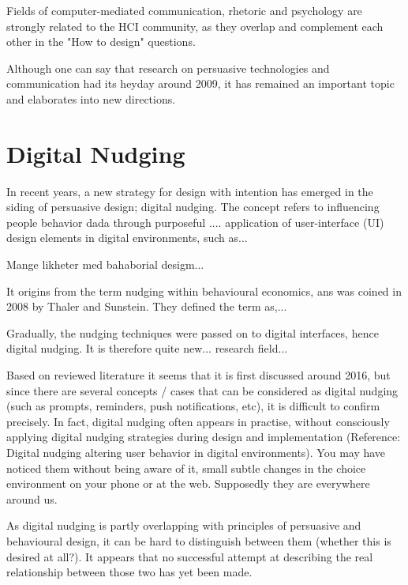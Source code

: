 {Fields of computer-mediated communication, rhetoric and psychology are strongly related to the HCI community, as they overlap and complement each other in the "How to design" questions. 


Although one can say that research on persuasive technologies and communication had its heyday around 2009, it has remained an important topic and elaborates into new directions. 


\section{Digital Nudging}
In recent years, a new strategy for design with intention has emerged in the siding of persuasive design; digital nudging. The concept refers to influencing people behavior dada through purposeful .... application of user-interface (UI) design elements in digital environments, such as... 

Mange likheter med bahaborial desigm... 

It origins from the term nudging within behavioural economics, ans was coined in 2008 by Thaler and Sunstein. They defined the term as,...

Gradually, the nudging techniques were passed on to digital interfaces, hence digital nudging. It is therefore quite new...  research field... 

Based on reviewed literature it seems that it is first discussed around 2016, but since there are several concepts / cases that can be considered as digital nudging (such as prompts, reminders, push notifications, etc), it is difficult to confirm precisely. In fact, digital nudging often appears in practise, without consciously applying digital nudging strategies during design and implementation (Reference: Digital nudging altering user behavior in digital environments). You may have noticed them without being aware of it, small subtle changes in the choice environment on your phone or at the web. Supposedly they are everywhere around us.

As digital nudging is partly overlapping with principles of persuasive and behavioural design, it can be hard to distinguish between them (whether this is desired at all?). It appears that no successful attempt at describing the real relationship between those two has yet been made. 

}
